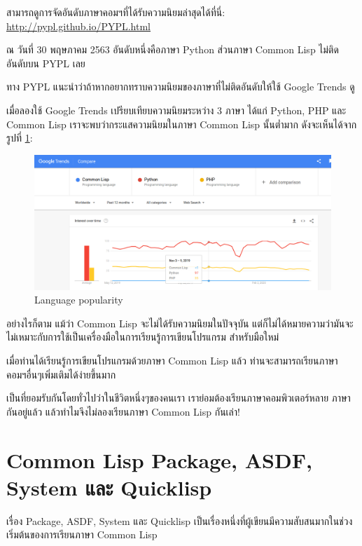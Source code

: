 \documentclass[a4paper]{article}
\begin{document}
สามารถดูการจัดอันดับภาษาคอมฯที่ได้รับความนิยมล่าสุดได้ที่นี่: \href{http://pypl.github.io/PYPL.html}{http://pypl.github.io/PYPL.html}

ณ วันที่ 30 พฤษภาคม 2563 อันดับหนึ่งคือภาษา Python ส่วนภาษา Common Lisp ไม่ติดอันดับบน PYPL เลย

ทาง PYPL แนะนำว่าถ้าหากอยากทราบความนิยมของภาษาที่ไม่ติดอันดับให้ใช้ Google Trends ดู

เมื่อลองใช้ Google Trends เปรียบเทียบความนิยมระหว่าง 3 ภาษา ได้แก่ Python, PHP
และ Common Lisp เราจะพบว่ากระแสความนิยมในภาษา Common Lisp นั้นต่ำมาก
ดังจะเห็นได้จากรูปที่ \ref{lang-pop}:

\begin{figure}[!hbtp]
  \includegraphics[width=\linewidth]{images/lang-popularity.png}
  \caption{Language popularity\label{lang-pop}}
\end{figure}

อย่างไรก็ตาม แม้ว่า Common Lisp จะไม่ได้รับความนิยมในปัจจุบัน
แต่ก็ไม่ได้หมายความว่ามันจะไม่เหมาะกับการใช้เป็นเครื่องมือในการเรียนรู้การเขียนโปรแกรม%
สำหรับมือใหม่

เมื่อท่านได้เรียนรู้การเขียนโปรแกรมด้วยภาษา Common Lisp แล้ว ท่านจะสามารถเรียนภาษา%
คอมฯอื่นๆเพิ่มเติมได้ง่ายขึ้นมาก

เป็นที่ยอมรับกันโดยทั่วไปว่าในชีวิตหนึ่งๆของคนเรา เราย่อมต้องเรียนภาษาคอมพิวเตอร์หลาย%
ภาษากันอยู่แล้ว แล้วทำไมจึงไม่ลองเรียนภาษา Common Lisp กันเล่า!


\section{Common Lisp Package, ASDF, System และ Quicklisp}

เรื่อง Package, ASDF, System และ Quicklisp
เป็นเรื่องหนึ่งที่ผู้เขียนมีความสับสนมากในช่วงเริ่มต้นของการเรียนภาษา Common Lisp
\end{document}
